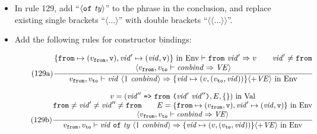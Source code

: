 \documentclass[twoside,titlepage]{article}
\begin{document}
\begin{appendix}
\begin{itemize}
\item In rule 129, add ``$\langle{\tt{of}}~\mathit{ty}\rangle$'' to the phrase in the conclusion, and replace existing single brackets ``$\langle\dots\rangle$'' with double brackets  ``$\langle\langle\dots\rangle\rangle$''.

\item Add the following rules for constructor bindings:

  \begin{equation}
  \tag{129a}
  \frac{
  \begin{array}{@{}c@{}}
  \mbox{$\{{\tt{from}}\mapsto(v_{\tt{from}},{\tt{v}}), \mathit{vid}'\mapsto(\mathit{vid},{\tt{v}})\}$ in Env} \vdash {\tt{from}}~\mathit{vid}' \Rightarrow v
  \qquad
  \mathit{vid}' \neq {\tt{from}}
  \\
  \langle v_{\tt{from}},v_{\tt{to}} \vdash \mathit{conbind} \Rightarrow \mathit{VE} \rangle
  \end{array}
  }{
  v_{\tt{from}},v_{\tt{to}} \vdash \mathit{vid}~\langle\mbox{\tt|}~\mathit{conbind}\rangle \Rightarrow \mbox{$\{\mathit{vid}\mapsto(v,(v_{\tt{to}},\mathit{vid}))\}\langle+\mathit{VE}\rangle$ in Env}
  }
  \end{equation}


  \begin{equation}
  \tag{129b}
  \frac{
  \begin{array}{@{}c@{}}
  v = \mbox{$(\mathit{vid}''~\mbox{\tt=>}~{\tt{from}}~\mbox{\tt(}\mathit{vid}'~\mathit{vid}''\mbox{\tt)}, E, \{\})$ in Val}
  \\
  {\tt{from}} \neq \mathit{vid}' \neq \mathit{vid}'' \neq {\tt{from}}
  \qquad
  E = \mbox{$\{{\tt{from}}\mapsto(v_{\tt{from}},{\tt{v}}), \mathit{vid}'\mapsto(\mathit{vid},{\tt{v}})\}$ in Env}
  \\
  \langle v_{\tt{from}},v_{\tt{to}} \vdash \mathit{conbind} \Rightarrow \mathit{VE} \rangle
  \end{array}
  }{
  v_{\tt{from}},v_{\tt{to}} \vdash \mathit{vid}~{\tt{of}}~\mathit{ty}~\langle\mbox{\tt|}~\mathit{conbind}\rangle \Rightarrow \mbox{$\{\mathit{vid}\mapsto(v,(v_{\tt{to}},\mathit{vid}))\}\langle+\mathit{VE}\rangle$ in Env}
  }
  \end{equation}


\end{itemize}
\end{appendix}
\end{document}
